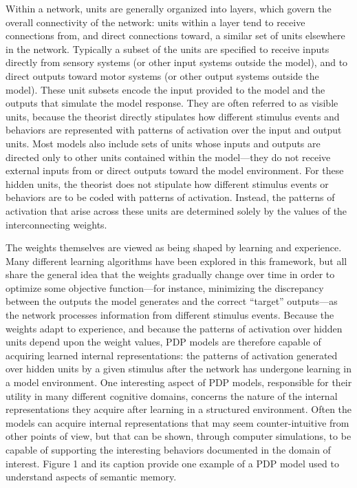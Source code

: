 Within a network, units are generally organized into layers, which govern the overall connectivity of the network: units within a layer tend to receive connections from, and direct connections toward, a similar set of units elsewhere in the network. Typically a subset of the units are specified to receive inputs directly from sensory systems (or other input systems outside the model), and to direct outputs toward motor systems (or other output systems outside the model). These unit subsets encode the input provided to the model and the outputs that simulate the model response. They are often referred to as visible units, because the theorist directly stipulates how different stimulus events and behaviors are represented with patterns of activation over the input and output units. Most models also include sets of units whose inputs and outputs are directed only to other units contained within the model---they do not receive external inputs from or direct outputs toward the model environment. For these hidden units, the theorist does not stipulate how different stimulus events or behaviors are to be coded with patterns of activation. Instead, the patterns of activation that arise across these units are determined solely by the values of the interconnecting weights. 

The weights themselves are viewed as being shaped by learning and experience. Many different learning algorithms have been explored in this framework, but all share the general idea that the weights gradually change over time in order to optimize some objective function---for instance, minimizing the discrepancy between the outputs the model generates and the correct ``target'' outputs---as the network processes information from different stimulus events. Because the weights adapt to experience, and because the patterns of activation over hidden units depend upon the weight values, PDP models are therefore capable of acquiring learned internal representations: the patterns of activation generated over hidden units by a given stimulus after the network has undergone learning in a model environment.  One interesting aspect of PDP models, responsible for their utility in many different cognitive domains, concerns the nature of the internal representations they acquire after learning in a structured environment. Often the models can acquire internal representations that may seem counter-intuitive from other points of view, but that can be shown, through computer simulations, to be capable of supporting the interesting behaviors documented in the domain of interest. Figure 1 and its caption provide one example of a PDP model used to understand aspects of semantic memory.

